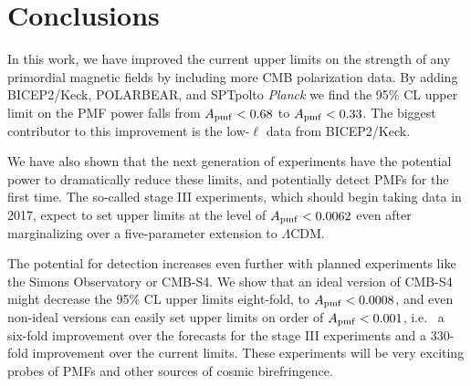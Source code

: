 \documentclass[preprint]{emulateapj}
\newcommand{\apmf}{\ensuremath{A_{\rm pmf}}}
\newcommand{\lcdm}{\ensuremath{\Lambda}CDM}
\newcommand{\planck}{{\sl Planck}}
\newcommand{\bicepkeck}{BICEP2/Keck}
\newcommand{\pb}{POLARBEAR}
\newcommand{\sptpol}{SPTpol}
\begin{document}
\section{Conclusions}
\label{sec:conclusions}

In this work, we have improved the current upper limits on the strength of any primordial magnetic fields by including more CMB polarization data. 
By adding \bicepkeck{}, \pb, and \sptpol to \planck{} we find the 95\% CL upper limit on the PMF power falls from $\apmf < 0.68$ to $\apmf < 0.33$. 
The biggest contributor to this improvement is the low-$\ell$ data from \bicepkeck{}. 

We have also shown that the next generation of experiments have the potential power to dramatically reduce these limits, and potentially detect PMFs for the first time. 
The so-called stage III experiments, which should begin taking data in 2017, expect to set upper limits at the level of $\apmf < 0.0062$ even after marginalizing over a five-parameter extension to \lcdm.

The potential for detection increases even further with planned experiments like the Simons Observatory or CMB-S4. 
We show that an ideal version of CMB-S4 might decrease the 95\% CL upper limits eight-fold, to $\apmf < 0.0008$, and even non-ideal versions can easily set upper limits on order of $\apmf < 0.001$, i.e.~ a six-fold improvement over the forecasts for the stage III experiments and a 330-fold improvement over the current limits. 
These experiments will be very exciting probes of PMFs and other sources of cosmic birefringence. 


\end{document}
